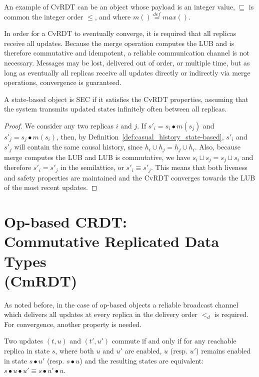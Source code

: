 An example of CvRDT can be an object whose payload is an integer value,
$\sqsubseteq$ is common the integer order $\leq$, and where $m()
\stackrel{def}{=} max()$.

In order for a CvRDT to eventually converge, it is required that all replicas
receive all updates. Because the merge operation computes the LUB and is
therefore commutative and idempotent, a reliable communication channel is not
necessary. Messages may be lost, delivered out of order, or multiple time, but
as long as eventually all replicas receive all updates directly or indirectly
via merge operations, convergence is guaranteed.

\begin{theorem}
\begin{itshape}
A state-based object is SEC if it satisfies the CvRDT properties, assuming that
the system transmits updated states infinitely often between all replicas.
\end{itshape}
\end{theorem}

\begin{proof}
We consider any two replicas $i$ and $j$. If $s'_{i} = s_{i} \bullet m(s_{j})$
and $s'_{j} = s_{j} \bullet m(s_{i})$, then, by
Definition~\ref{def:casual_history_state-based}, $s'_{i}$ and $s'_{j}$ will
contain the same causal history, since $h_{i} \cup h_{j} = h_{j} \cup h_{i}$.
Also, because merge computes the LUB and LUB is commutative, we have $s_{i}
\sqcup s_{j} = s_{j} \sqcup s_{i}$ and therefore $s'_{i} = s'_{j}$ in the
semilattice, or $s'_{i} \equiv s'_{j}$. This means that both liveness and safety
properties are maintained and the CvRDT converges towards the LUB of the most
recent updates.
\end{proof}
 
\section[Op-based CRDT: Commutative Replicated Data Types (CmRDT)]{Op-based
CRDT:\\Commutative Replicated Data Types\\(CmRDT)}
\label{sec:commutative_replicated_data_types}

As noted before, in the case of op-based objects a reliable broadcast channel
which delivers all updates at every replica in the delivery order $<_{d}$ is
required. For convergence, another property is needed.

\begin{definition}
\begin{itshape}
Two updates $(t,u)$ and $(t',u')$ commute if and only if for any reachable
replica in state $s$, where both $u$ and $u'$ are enabled, $u$ (resp. $u'$)
remains enabled in state $s \bullet u'$ (resp. $s \bullet u$) and the resulting
states are equivalent: $s \bullet u \bullet u' \equiv s \bullet u' \bullet u$.
\end{itshape}
\end{definition}

